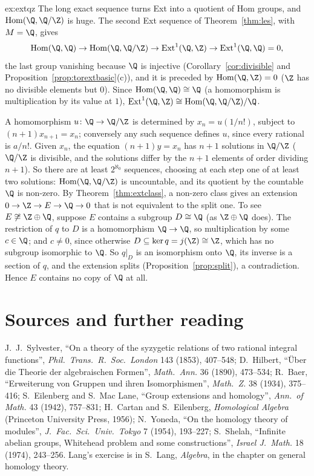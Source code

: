 \begin{solution}{ex:extqz}
\idea The long exact sequence turns Ext into a quotient of Hom groups, and $\operatorname{Hom}(\Q,\Q/\Z)$ is huge.
\writeup The second Ext sequence of Theorem~\ref{thm:les}, with $M=\Q$, gives
\[
\operatorname{Hom}(\Q,\Q)\to\operatorname{Hom}(\Q,\Q/\Z)\to\operatorname{Ext}^1(\Q,\Z)\to\operatorname{Ext}^1(\Q,\Q)=0,
\]
the last group vanishing because $\Q$ is injective (Corollary~\ref{cor:divisible} and Proposition~\ref{prop:torextbasic}(c)), and it is preceded by $\operatorname{Hom}(\Q,\Z)=0$ ($\Z$ has no divisible elements but $0$). Since
$\operatorname{Hom}(\Q,\Q)\cong\Q$ (a homomorphism is multiplication by its value at $1$), $\operatorname{Ext}^1(\Q,\Z)\cong\operatorname{Hom}(\Q,\Q/\Z)/\Q$.

A homomorphism $u\colon\Q\to\Q/\Z$ is determined by $x_n=u(1/n!)$, subject to $(n+1)x_{n+1}=x_n$; conversely any such sequence defines $u$, since every rational is $a/n!$. Given $x_n$, the equation $(n+1)y=x_n$ has $n+1$ solutions
in $\Q/\Z$ ($\Q/\Z$ is divisible, and the solutions differ by the $n+1$ elements of order dividing $n+1$). So there are at least $2^{\aleph_0}$ sequences, choosing at each step one of at least two solutions: $\operatorname{Hom}(\Q,\Q/\Z)$
is uncountable, and its quotient by the countable $\Q$ is non-zero. By Theorem~\ref{thm:extclass}, a non-zero class gives an extension $0\to\Z\to E\to\Q\to0$ that is not equivalent to the split one. To see $E\not\cong\Z\oplus\Q$,
suppose $E$ contains a subgroup $D\cong\Q$ (as $\Z\oplus\Q$ does). The restriction of $q$ to $D$ is a homomorphism $\Q\to\Q$, so multiplication by some $c\in\Q$; and $c\ne0$, since otherwise $D\subseteq\ker q=j(\Z)\cong\Z$, which has no subgroup
isomorphic to $\Q$. So $q|_D$ is an isomorphism onto $\Q$, its inverse is a section of $q$, and the extension splits (Proposition~\ref{prop:split}), a contradiction. Hence $E$ contains no copy of $\Q$ at all.
\end{solution}

\section*{Sources and further reading}

J.~J.~Sylvester, ``On a theory of the syzygetic relations of two rational integral functions'', \emph{Phil.\ Trans.\ R.\ Soc.\ London} 143 (1853), 407--548; D.~Hilbert, ``Über die Theorie der algebraischen Formen'', \emph{Math.\ Ann.} 36
(1890), 473--534; R.~Baer, ``Erweiterung von Gruppen und ihren Isomorphismen'', \emph{Math.\ Z.} 38 (1934), 375--416; S.~Eilenberg and S.~Mac Lane, ``Group extensions and homology'', \emph{Ann.\ of Math.} 43 (1942), 757--831;
H.~Cartan and S.~Eilenberg, \emph{Homological Algebra} (Princeton University Press, 1956); N.~Yoneda, ``On the homology theory of modules'', \emph{J.\ Fac.\ Sci.\ Univ.\ Tokyo} 7 (1954), 193--227; S.~Shelah, ``Infinite abelian groups,
Whitehead problem and some constructions'', \emph{Israel J.\ Math.} 18 (1974), 243--256. Lang's exercise is in S.~Lang, \emph{Algebra}, in the chapter on general homology theory.

